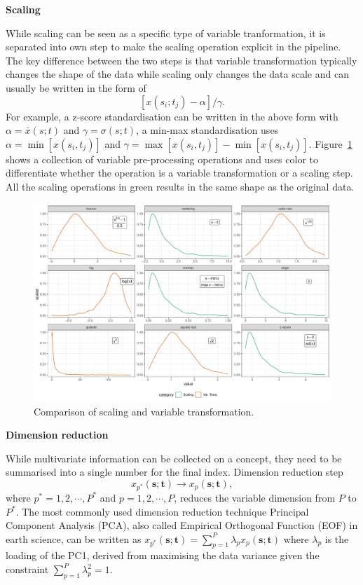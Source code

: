 \documentclass[
]{article}
\begin{document}
\textbf{Scaling}

While scaling can be seen as a specific type of variable tranformation,
it is separated into own step to make the scaling operation explicit in
the pipeline. The key difference between the two steps is that variable
transformation typically changes the shape of the data while scaling
only changes the data scale and can usually be written in the form of
\[[x(s_i;t_j) - \alpha]/\gamma.\] For example, a z-score standardisation
can be written in the above form with \(\alpha = \bar{x}(s; t)\) and
\(\gamma = \sigma(s; t)\), a min-max standardisation uses
\(\alpha = \min[x(s_i, t_j)]\) and
\(\gamma = \max[x(s_i, t_j)] - \min[x(s_i, t_j)]\).
Figure~\ref{fig-scale-var-trans-compare} shows a collection of variable
pre-processing operations and uses color to differentiate whether the
operation is a variable transformation or a scaling step. All the
scaling operations in green results in the same shape as the original
data.

\begin{figure}

{\centering \includegraphics{paper_files/figure-pdf/fig-scale-var-trans-compare-1.pdf}

}

\caption{\label{fig-scale-var-trans-compare}Comparison of scaling and
variable transformation.}

\end{figure}

\newpage

\textbf{Dimension reduction}

While multivariate information can be collected on a concept, they need
to be summarised into a single number for the final index. Dimension
reduction step
\[x_{p^*}(\mathbf{s}; \mathbf{t}) \rightarrow x_p(\mathbf{s}; \mathbf{t}),\]
where \(p^* = 1, 2, \cdots, P^*\) and \(p = 1, 2, \cdots, P\), reduces
the variable dimension from \(P\) to \(P^*\). The most commonly used
dimension reduction technique Principal Component Analysis (PCA), also
called Empirical Orthogonal Function (EOF) in earth science, can be
written as
\(x_{p^*}(\mathbf{s}; \mathbf{t}) = \sum_{p = 1}^{P}\lambda_{p}x_p(\mathbf{s};\mathbf{t})\)
where \(\lambda_p\) is the loading of the PC1, derived from maximising
the data variance given the constraint \(\sum_{p=1}^P\lambda_p^2 = 1\).
\end{document}
